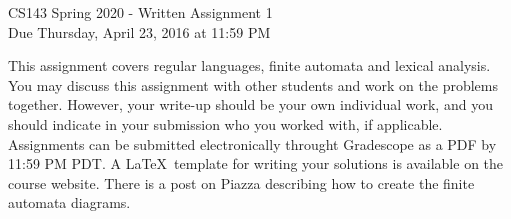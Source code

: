 \documentclass[11pt]{article}
\begin{document}
\begin{center}
\LARGE CS143 Spring 2020 - Written Assignment 1 \\
\large Due Thursday, April 23, 2016 at 11:59 PM
\end{center}

This assignment covers regular languages, finite automata and lexical analysis. You may discuss this assignment with other students and work on the problems together. However, your write-up should be your own individual work, and you should indicate in your submission who you worked with, if applicable. Assignments can be submitted electronically throught Gradescope as a PDF by 11:59 PM PDT. A \LaTeX \ template for writing your solutions is available on the course website. There is a post on Piazza describing how to create the finite automata diagrams.
\end{document}
